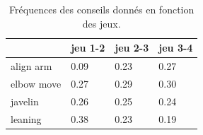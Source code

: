 %

\begin{table}%
\centering
\begin{tabular}{l|lll}
           & jeu 1-2 & jeu 2-3 & jeu 3-4 \\\hline
align arm  & 0.09      & 0.23      & 0.27      \\
elbow move & 0.27      & 0.29      & 0.30      \\
javelin    & 0.26      & 0.25      & 0.24      \\
leaning    & 0.38      & 0.23      & 0.19
\end{tabular}
\caption{Fréquences des conseils donnés en fonction des jeux.}
\label{tab:advices_freq}
\end{table}


